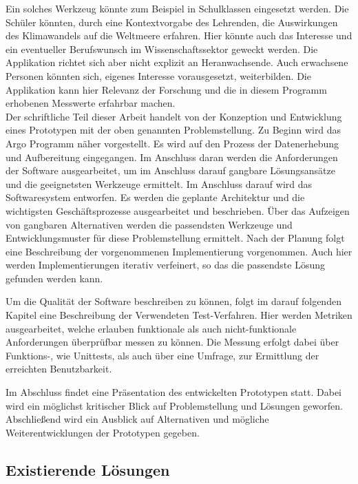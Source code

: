     
    Ein solches Werkzeug könnte zum Beispiel in Schulklassen eingesetzt werden. 
    Die Schüler könnten, durch eine Kontextvorgabe des Lehrenden, die Auswirkungen des Klimawandels auf die Weltmeere erfahren.
    Hier könnte auch das Interesse und ein eventueller Berufswunsch im Wissenschaftssektor geweckt werden.
    Die Applikation richtet sich aber nicht explizit an Heranwachsende. Auch erwachsene Personen könnten sich, eigenes Interesse vorausgesetzt, weiterbilden. Die Applikation kann hier Relevanz der Forschung und die in diesem Programm erhobenen Messwerte erfahrbar machen. \\
    
    
    Der schriftliche Teil dieser Arbeit handelt von der Konzeption und Entwicklung eines Prototypen mit der oben genannten Problemstellung. Zu Beginn wird das Argo Programm näher vorgestellt. Es wird auf den Prozess der Datenerhebung und Aufbereitung eingegangen. Im Anschluss daran werden die Anforderungen der Software ausgearbeitet, um im Anschluss darauf gangbare Lösungsansätze und die geeignetsten Werkzeuge ermittelt.
    Im Anschluss darauf wird das Softwaresystem entworfen. Es werden die geplante Architektur und die wichtigsten Geschäftsprozesse ausgearbeitet und beschrieben. Über das 
    Aufzeigen von gangbaren Alternativen werden die passendsten Werkzeuge und Entwicklungsmuster für diese Problemstellung ermittelt.
    Nach der Planung folgt eine Beschreibung der vorgenommenen Implementierung vorgenommen. Auch hier werden Implementierungen iterativ verfeinert, so das die passendste Lösung gefunden werden kann.

    Um die Qualität der Software beschreiben zu können, folgt im darauf folgenden Kapitel eine Beschreibung der Verwendeten Test-Verfahren. Hier werden Metriken ausgearbeitet, welche erlauben funktionale als auch nicht-funktionale Anforderungen überprüfbar messen zu können. Die Messung erfolgt dabei über Funktions-, wie Unittests, als auch über eine Umfrage, zur Ermittlung der erreichten Benutzbarkeit. 
    
    Im Abschluss findet eine Präsentation des entwickelten Prototypen statt. Dabei wird ein möglichst kritischer Blick auf Problemstellung und Lösungen geworfen. Abschließend wird ein Ausblick auf Alternativen und mögliche Weiterentwicklungen der Prototypen gegeben.
    
    
    
\subsection{Existierende Lösungen}
  
